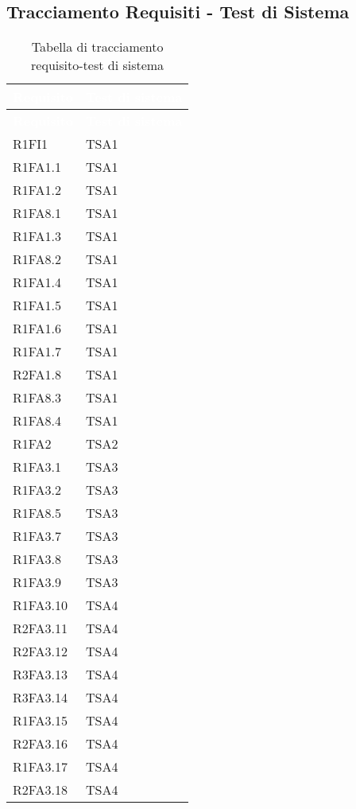 \subsection{Tracciamento Requisiti - Test di Sistema}
{
\renewcommand{\arraystretch}{1.5}
\centering
\begin{longtable}{C{4cm} C{4cm}}
\caption{Tabella di tracciamento requisito-test di sistema}\\
\textcolor{white}{\textbf{Requisito}} & \textcolor{white}{\textbf{Test di sistema}}\\	
\endfirsthead
{}
\textcolor{white}{\textbf{Requisito}} & \textcolor{white}{\textbf{Test di sistema}}\\	
\endhead

R1FI1 & TSA1  \\
R1FA1.1 & TSA1  \\
R1FA1.2 & TSA1  \\
R1FA8.1 & TSA1  \\
R1FA1.3 & TSA1  \\
R1FA8.2 & TSA1  \\
R1FA1.4 & TSA1  \\
R1FA1.5 & TSA1  \\
R1FA1.6 & TSA1  \\
R1FA1.7 & TSA1  \\
R2FA1.8 & TSA1  \\
R1FA8.3 & TSA1  \\
R1FA8.4 & TSA1  \\

R1FA2 & TSA2  \\

R1FA3.1 & TSA3  \\
R1FA3.2 & TSA3  \\
R1FA8.5 & TSA3  \\
R1FA3.7 & TSA3  \\
R1FA3.8 & TSA3  \\
R1FA3.9 & TSA3  \\

R1FA3.10 & TSA4  \\
R2FA3.11 & TSA4  \\
R2FA3.12 & TSA4  \\
R3FA3.13 & TSA4  \\
R3FA3.14 & TSA4  \\
R1FA3.15 & TSA4  \\
R2FA3.16 & TSA4  \\
R1FA3.17 & TSA4  \\
R2FA3.18 & TSA4  \\


\end{longtable}}
